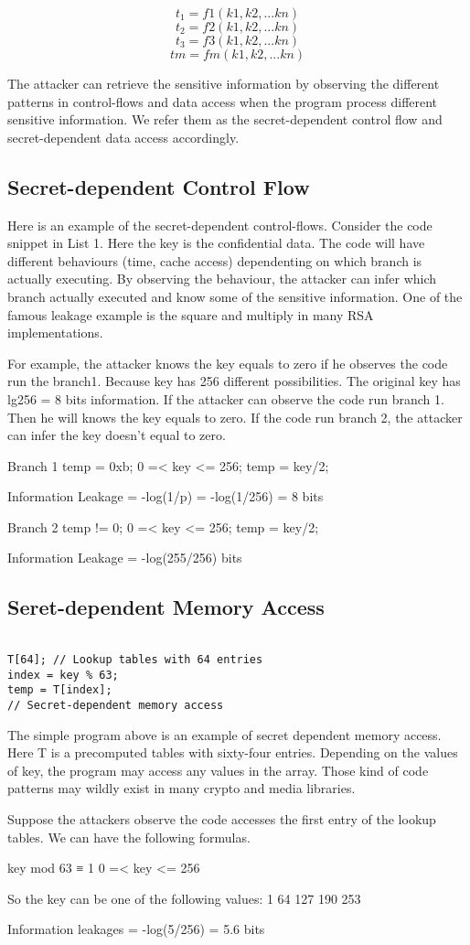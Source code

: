 $$t_1 = f1(k1, k2, ... kn)$$
$$t_2 = f2(k1, k2, ... kn)$$
$$t_3 = f3(k1, k2, ... kn)$$
$$tm = fm(k1, k2, ... kn)$$


The attacker can retrieve the sensitive information by observing the different patterns in control-flows and data access when the program process different sensitive information. We refer them as the secret-dependent control flow and secret-dependent data access accordingly.

\subsection{Secret-dependent Control Flow}
Here is an example of the secret-dependent control-flows. Consider the code snippet in List 1. Here the key is the confidential data. The code will have different behaviours (time, cache access) dependenting on which branch is actually executing. By observing the behaviour, the attacker can infer which branch actually executed and know some of the sensitive information. One of the famous leakage example is the square and multiply in many RSA implementations. 

For example, the attacker knows the key equals to zero if he observes the code run the branch1. Because key has 256 different possibilities. The original key has lg256 = 8 bits information. If the attacker can observe the code run branch 1. Then he will knows the key equals to zero. If the code run branch 2, the attacker can infer the key doesn’t equal to zero. 

Branch 1
temp = 0xb;
0 =< key <= 256;
temp = key/2;

Information Leakage = -log(1/p) = -log(1/256) = 8 bits

Branch 2
temp != 0; 
0 =< key <= 256;
temp = key/2;

Information Leakage = -log(255/256) bits

\subsection{Seret-dependent Memory Access}

\begin{lstlisting}

T[64]; // Lookup tables with 64 entries
index = key % 63;
temp = T[index]; 
// Secret-dependent memory access       

\end{lstlisting}

The simple program above is an example of secret dependent memory access. Here T is a precomputed tables with sixty-four entries. Depending on the values of key, the program may access any values in the array. Those kind of code patterns may wildly exist in many crypto and media libraries. 

Suppose the attackers observe the code accesses the first entry of the lookup tables. We can have the following formulas.

key mod 63 ≡ 1
0 =< key <= 256

So the key can be one of the following values:
1 64 127 190 253

Information leakages = -log(5/256) =  5.6 bits

